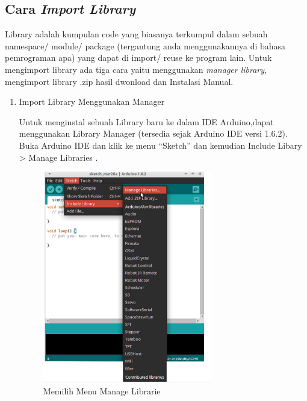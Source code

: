 \subsection{Cara \textit{Import Library}}
\par Library adalah kumpulan code yang biasanya terkumpul dalam sebuah namespace/ module/ package (tergantung anda menggunakannya di bahasa pemrograman apa) yang dapat di import/ reuse ke program lain. Untuk mengimport library ada tiga cara yaitu menggunakan \textit{manager library}, mengimport library .zip hasil dwonload dan Instalasi Manual.
\begin{enumerate}
    \item Import Library Menggunakan Manager
\par Untuk menginstal sebuah Library baru ke dalam IDE Arduino,dapat menggunakan Library Manager (tersedia sejak Arduino IDE versi 1.6.2). Buka Arduino IDE dan klik ke menu “Sketch” dan kemudian Include Libary > Manage Libraries .
\begin{figure}[H]
\centering
\includegraphics[width=0.7\textwidth]{figures/manager1.png}
\caption{Memilih Menu Manage Librarie}
\label{print}
\end{figure}


\end{enumerate}
